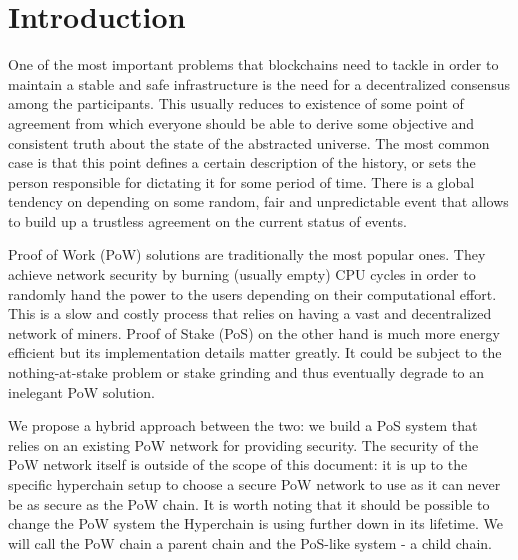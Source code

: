 \section{Introduction}

One of the most important problems that blockchains need to tackle in order to
maintain a stable and safe infrastructure is the need for a decentralized
consensus among the participants. This usually reduces to existence of some
point of agreement from which everyone should be able to derive some objective
and consistent truth about the state of the abstracted universe. The most common
case is that this point defines a certain description of the history, or sets
the person responsible for dictating it for some period of time. There is a
global tendency on depending on some random, fair and unpredictable event that
allows to build up a trustless agreement on the current status of events.

Proof of Work (PoW) solutions are traditionally the most popular ones.
They achieve network security by burning (usually empty) CPU cycles in order to
randomly hand the power to the users depending on their computational effort.
This is a slow and costly process that relies on having
a vast and decentralized network of miners. Proof of Stake (PoS) on the other
hand is much more energy efficient but its implementation details matter
greatly. It could be subject to the nothing-at-stake problem or stake grinding and
thus eventually degrade to an inelegant PoW solution.

We propose a hybrid approach between the two: we build a PoS system that
relies on an existing PoW network for providing security. The security of the
PoW network itself is outside of the scope of this document: it is up to
the specific hyperchain setup to choose a secure PoW network to use as it
can never be as secure as the PoW chain. It is worth noting that it should
be possible to change the PoW system the Hyperchain is using further down
in its lifetime. We will call the PoW chain a parent chain and the PoS-like
system - a child chain.


